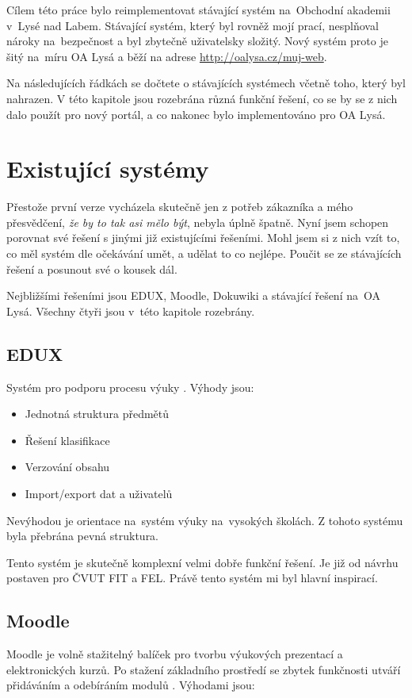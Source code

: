 \documentclass[thesis=B,czech]{FITthesis}[2012/06/26]
\begin{document}
Cílem této práce bylo reimplementovat stávající systém na~Obchodní akademii v~Lysé nad Labem. Stávající systém, který byl rovněž mojí prací, nesplňoval nároky na~bezpečnost a byl zbytečně uživatelsky složitý. Nový systém proto je šitý na~míru OA Lysá a běží na adrese \url{http://oalysa.cz/muj-web}.

Na následujících řádkách se dočtete o stávajících systémech včetně toho, který byl nahrazen. V této kapitole jsou rozebrána různá funkční řešení, co se by se z nich dalo použít pro nový portál, a co nakonec bylo implementováno pro OA Lysá.

\section{Existující systémy}

Přestože první verze vycházela skutečně jen z potřeb zákazníka a mého přesvědčení, \textit{že by to tak asi mělo být}, nebyla úplně špatně. Nyní jsem schopen porovnat své řešení s jinými již existujícími řešeními. Mohl jsem si z nich vzít to, co měl systém dle očekávání umět, a udělat to co nejlépe. Poučit se ze stávajících řešení a posunout své o kousek dál.

Nejbližšími řešeními jsou EDUX, Moodle, Dokuwiki a stávající řešení na~OA Lysá. Všechny čtyři jsou v~této kapitole rozebrány.

\subsection{EDUX}
Systém pro podporu procesu výuky \cite{edux}. Výhody jsou:

\begin{itemize}
	\item Jednotná struktura předmětů
	\item	Řešení klasifikace
	\item Verzování obsahu
	\item Import/export dat a uživatelů
\end{itemize}

Nevýhodou je orientace na~systém výuky na~vysokých školách. Z tohoto systému byla přebrána pevná struktura.

Tento systém je skutečně komplexní velmi dobře funkční řešení. Je již od návrhu postaven pro ČVUT FIT a FEL. Právě tento systém mi byl hlavní inspirací.

\subsection{Moodle}
Moodle je volně stažitelný balíček pro tvorbu výukových prezentací a elektronických kurzů. Po stažení základního prostředí se zbytek funkčnosti utváří přidáváním a odebíráním modulů \cite{moodle}. Výhodami jsou:
\end{document}
